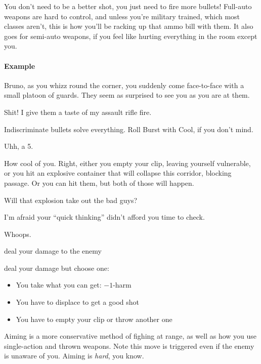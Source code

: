 You don't need to be a better shot, you just need to fire more
bullets! Full-auto weapons are hard to control, and unless you're
military trained, which most classes aren't, this is how you'll be
racking up that ammo bill with them. It also goes for semi-auto
weapons, if you feel like hurting everything in the room except you.

\paragraph{Example}
\begin{dialogue}
   Bruno, as you whizz round the corner, you suddenly come
  face-to-face with a small platoon of guards. They seem as surprised
  to see you as you are at them.

   Shit! I give them a taste of my assault rifle fire.

   Indiscriminate bullets solve everything. Roll Burst with
  Cool, if you don't mind.

   Uhh, a 5.

   How cool of you. Right, either you empty your clip,
  leaving yourself vulnerable, or you hit an explosive container that
  will collapse this corridor, blocking passage. Or you can hit them,
  but both of those will happen.

   Will that explosion take out the bad guys?

   I'm afraid your ``quick thinking'' didn't afford you time to check.

   Whoops.
\end{dialogue}

{deal your damage to the enemy}
{deal your damage but choose one:
\begin{itemize}
\item You take what you can get: $-1$-harm
\item You have to displace to get a good shot
\item You have to empty your clip or throw another one
\end{itemize}}

Aiming is a more conservative method of fighing at range, as well as
how you use single-action and thrown weapons. Note this move is
triggered even if the enemy is unaware of you. Aiming is \emph{hard},
you know.


